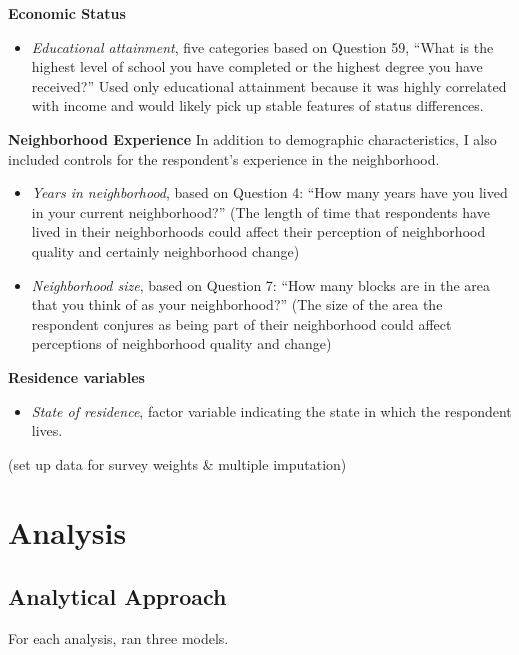 \documentclass[]{article}
\providecommand{\tightlist}{%
  \setlength{\itemsep}{0pt}\setlength{\parskip}{0pt}}
\theoremstyle{definition}
\theoremstyle{definition}
\theoremstyle{definition}
\theoremstyle{remark}
\begin{document}
\textbf{Economic Status}

\begin{itemize}
\tightlist
\item
  \emph{Educational attainment}, five categories based on Question 59,
  ``What is the highest level of school you have completed or the
  highest degree you have received?'' Used only educational attainment
  because it was highly correlated with income and would likely pick up
  stable features of status differences.
\end{itemize}

\textbf{Neighborhood Experience} In addition to demographic
characteristics, I also included controls for the respondent's
experience in the neighborhood.

\begin{itemize}
\item
  \emph{Years in neighborhood}, based on Question 4: ``How many years
  have you lived in your current neighborhood?'' (The length of time
  that respondents have lived in their neighborhoods could affect their
  perception of neighborhood quality and certainly neighborhood change)
\item
  \emph{Neighborhood size}, based on Question 7: ``How many blocks are
  in the area that you think of as your neighborhood?'' (The size of the
  area the respondent conjures as being part of their neighborhood could
  affect perceptions of neighborhood quality and change)
\end{itemize}

\textbf{Residence variables}

\begin{itemize}
\tightlist
\item
  \emph{State of residence}, factor variable indicating the state in
  which the respondent lives.
\end{itemize}

(set up data for survey weights \& multiple imputation)

\section{Analysis}\label{analysis}

\subsection{Analytical Approach}\label{analytical-approach}

For each analysis, ran three models.
\end{document}
